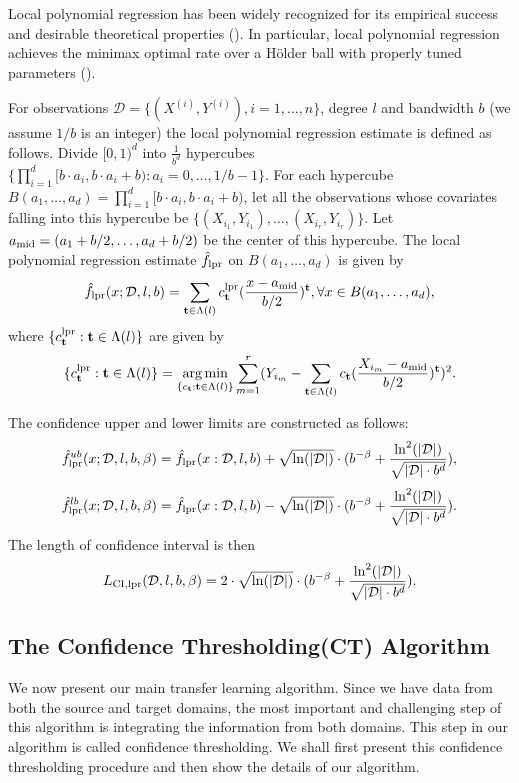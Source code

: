 \documentclass{article}
\def\holder{H\"{o}lder }
\def\D{\mathcal{D}}
\def\t{\textbf{t}}
\def\lpr{\hat f_{\rm lpr}}
\newcommand{\argmin}{\mathop{\rm arg\min}}
\begin{document}
Local polynomial regression has been widely recognized for its empirical success and desirable theoretical properties  (\citealp{cleveland1988locally,fan1992variable,fan1993local}).
In particular, local polynomial regression achieves the minimax optimal rate over a \holder ball with properly tuned parameters (\citealp{gyorfi2002distribution}). 

For observations $\D=\{(X^{(i)},Y^{(i)}),i=1,\dots,n\}$, degree $l$ and bandwidth $b$ (we assume $1/b$ is an integer) the local polynomial regression estimate is defined as follows. Divide $[0,1)^d$ into $\frac{1}{b^d}$ hypercubes $\{\prod_{i=1}^d [b\cdot a_i,b\cdot a_i+b):a_i=0,\dots,1/b-1\}$. For each hypercube $B(a_1,\dots,a_d)=\prod_{i=1}
^d [b\cdot a_i,b\cdot a_i+b)$, let all the observations whose covariates falling into this hypercube be $\{(X_{i_1},Y_{i_1}),\dots,(X_{i_r},Y_{i_r})\}$. Let $a_{\rm mid}=(a_1+b/2,\dots,a_d+b/2)$ be the center of this hypercube. The local polynomial regression estimate $\hat f_{\rm lpr}$ on $B(a_1,\dots,a_d)$ is given by
$$\lpr(x;\D,l,b)=\sum_{\t\in \Lambda(l)}c_{\t}^{\rm lpr}(\frac{x-a_{\rm mid}}{b/2})^{\t}, \forall x\in B(a_1,\dots,a_d),$$
where $\{c_{\t}^{\rm lpr}:\t\in \Lambda(l)\}$ are given by $$\{c_{\t}^{\rm lpr}:\t\in \Lambda(l)\}=\argmin_{\{c_\t:\t\in \Lambda(l)\}}\sum_{m=1}^r (Y_{i_m}-\sum_{\t\in \Lambda(l)}c_{\t}(\frac{X_{i_m}-a_{\rm mid}}{b/2})^{\t})^2.$$

The confidence upper and lower limits are constructed as follows:
$$\lpr^{ub}(x;\D,l,b,\beta)=\lpr(x:\D,l,b)+\sqrt{\ln(|\D|)}\cdot (b^{-\beta}+\frac{\ln^2(|\D|)}{\sqrt{|\D|\cdot b^d}}),$$
$$\lpr^{lb}(x;\D,l,b,\beta)=\lpr(x:\D,l,b)-\sqrt{\ln(|\D|)}\cdot (b^{-\beta}+\frac{\ln^2(|\D|)}{\sqrt{|\D|\cdot b^d}}).$$
The length of confidence interval is then
$$L_{\rm CI,lpr}(\D,l,b,\beta)=2\cdot \sqrt{\ln(|\D|)}\cdot (b^{-\beta}+\frac{\ln^2(|\D|)}{\sqrt{|\D|\cdot b^d}}).$$

\subsection{The Confidence Thresholding(CT) Algorithm}
\label{section: alg}

We now present our main transfer learning algorithm. Since we have data from both the source and target domains, the most important and challenging step of this algorithm is integrating the information from both domains. This step in our algorithm is called confidence thresholding. We shall first present this confidence thresholding procedure and then show the details of our algorithm.
\end{document}
